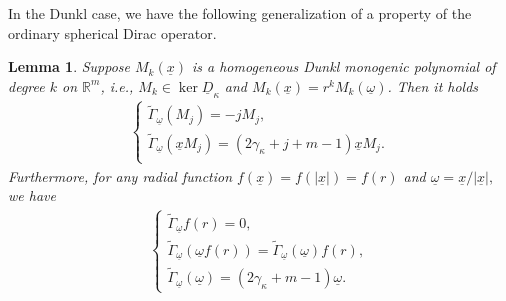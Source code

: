 \documentclass{amsart}
\newtheorem{lemma}[theorem]{Lemma}
\theoremstyle{definition}
\theoremstyle{remark}
\newtheorem{remark}[theorem]{Remark}
\numberwithin{equation}{section}
\begin{document}
In the Dunkl case, we have the following generalization of a property of the ordinary spherical Dirac operator.
\begin{lemma} \cite{fck} Suppose $M_{k}(\underline{x})$ is a homogeneous Dunkl monogenic polynomial of degree $k$ on $\mathbb{R}^{m}$, i.e., $M_{k}\in\ker\underline D_\kappa$ and $M_{k}(\underline x)=r^kM_k(\underline\omega)$. Then it holds
\begin{equation}\label{pk1}
\begin{split}
    			\left\{
    			\begin{array}{ll}
    				 \widetilde{\Gamma}_{\underline\omega}(M_j)=-jM_j,\\
    				\widetilde{\Gamma}_{\underline\omega}(\underline xM_j)=(2\gamma_{\kappa}+j+m-1)\underline xM_j.\\
    			\end{array}
    			\right.
    		\end{split}
\end{equation}
Furthermore, for any radial function $f(\underline{x})=f(|\underline{x}|)=f(r)$ and $\underline{\omega}=\underline{x}/|\underline{x}|,$ we have
\begin{equation}\label{pk12}
\begin{split}
    			\left\{
    			\begin{array}{ll}
    				 \widetilde{\Gamma}_{\underline\omega}f(r)=0,\\
    				\widetilde{\Gamma}_{\underline\omega}(\underline{\omega}f(r))=\widetilde{\Gamma}_{\underline\omega}(\underline{\omega})f(r),\\
          \widetilde{\Gamma}_{\underline\omega}(\underline{\omega})=(2\gamma_{\kappa}+m-1)\underline{\omega}.
    			\end{array}
    			\right.
    		\end{split}
\end{equation}
\end{lemma}
~\\

\end{document}
